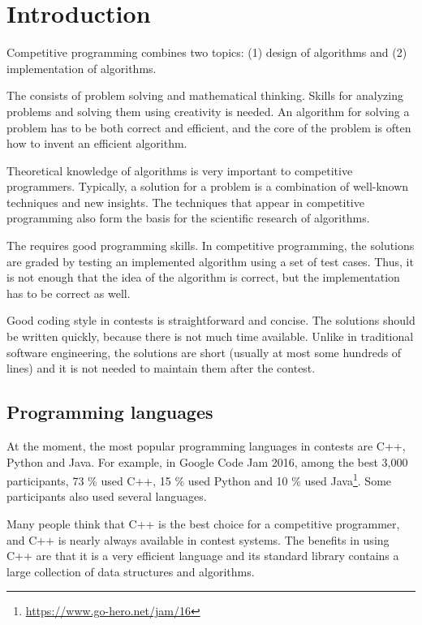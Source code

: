\chapter{Introduction}

Competitive programming combines two topics:
(1) design of algorithms and (2) implementation of algorithms.

The  consists of problem solving
and mathematical thinking.
Skills for analyzing problems and solving them
using creativity is needed.
An algorithm for solving a problem
has to be both correct and efficient,
and the core of the problem is often
how to invent an efficient algorithm.

Theoretical knowledge of algorithms
is very important to competitive programmers.
Typically, a solution for a problem is
a combination of well-known techniques and
new insights.
The techniques that appear in competitive programming
also form the basis for the scientific research
of algorithms.

The  requires good
programming skills.
In competitive programming, the solutions
are graded by testing an implemented algorithm
using a set of test cases.
Thus, it is not enough that the idea of the
algorithm is correct, but the implementation has
to be correct as well.

Good coding style in contests is
straightforward and concise.
The solutions should be written quickly,
because there is not much time available.
Unlike in traditional software engineering,
the solutions are short (usually at most some
hundreds of lines) and it is not needed to 
maintain them after the contest.

\section{Programming languages}


At the moment, the most popular programming
languages in contests are C++, Python and Java.
For example, in Google Code Jam 2016,
among the best 3,000 participants,
73 \% used C++,
15 \% used Python and
10 \% used Java\footnote{\url{https://www.go-hero.net/jam/16}}.
Some participants also used several languages.

Many people think that C++ is the best choice
for a competitive programmer,
and C++ is nearly always available in
contest systems.
The benefits in using C++ are that
it is a very efficient language and
its standard library contains a 
large collection
of data structures and algorithms.

